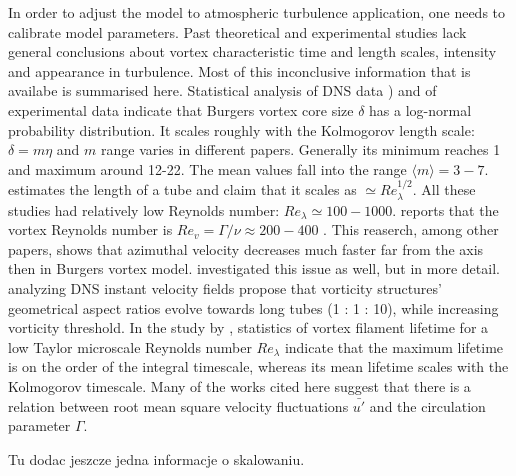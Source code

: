 \documentclass[../main.tex]{subfiles}
\begin{document}
In order to adjust the model to atmospheric turbulence application, one needs to calibrate model parameters. Past theoretical and experimental studies lack general conclusions about vortex characteristic time and length scales, intensity and appearance in turbulence. Most of this inconclusive information that is availabe is summarised here. Statistical analysis of DNS data \citep{Jimenez1998, Bellin1999, Moisy2004, Pirozzoli2012}) and of experimental data \citep{Mouri2003} indicate that Burgers vortex core size $\delta$ has a log-normal probability distribution. It scales roughly with the Kolmogorov length scale: $\delta= m\eta$ and $m$ range varies in different papers. Generally its minimum reaches 1 and maximum around 12-22. The mean values fall into the range $\langle m \rangle = 3-7$. \citet{Jimenez1998} estimates the length of a tube and claim that it scales as $\simeq Re_{\lambda}^{1/2}$. All these studies had relatively low Reynolds number: $Re_{\lambda} \simeq 100-1000$. \citet{Bellin1999} reports that the vortex Reynolds number is $Re_v=\Gamma/\nu \approx 200-400$ . This reaserch, among other papers, shows that azimuthal velocity decreases much faster far from the axis then in Burgers vortex model. \citet{Pirozzoli2012} investigated this issue as well, but in more detail. \citet{Moisy2004} analyzing DNS instant velocity fields propose that vorticity structures’ geometrical aspect ratios evolve towards long tubes (1 : 1 : 10), while increasing vorticity threshold. In the study by \citet{Biferale2010}, statistics of vortex filament lifetime for a low Taylor microscale Reynolds number $Re_{\lambda}$ indicate that the maximum lifetime is on the order of the integral timescale, whereas its mean lifetime scales with the Kolmogorov timescale. Many of the works cited here suggest that there is a relation between root mean square velocity fluctuations $\bar{u'}$ and the circulation parameter $\Gamma$.

Tu dodac jeszcze jedna informacje o skalowaniu.
\end{document}
